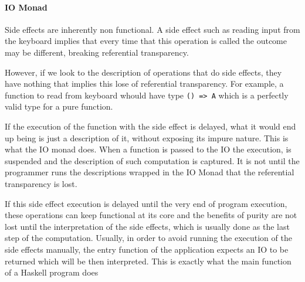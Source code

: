 \documentclass[../main.tex]{subfiles}
\begin{document}



\paragraph{IO Monad}
Side effects are inherently non functional. A side effect such as reading input
from the keyboard implies that every time that this operation is called the
outcome may be different, breaking referential transparency.

However, if we look to the description of operations that do side effects, they
have nothing that implies this lose of referential transparency. For example,
a function to read from keyboard whould have type \texttt{() => A} which is a
perfectly valid type for a pure function.

If the execution of the function with the side effect is delayed, what it
would end up being is just a description of it, without exposing its impure
nature. This is what the IO monad does. When a function is passed to the IO
the execution, is suspended and the description of such computation is captured. It is not
until the programmer runs the descriptions wrapped in the IO Monad that the
referential transparency is lost.

If this side effect execution is delayed until the very end of program execution, these operations
can keep functional at its core and the benefits of purity are not lost until
the interpretation of the side effects, which is usually done as the last step of
the computation. Usually, in order to avoid running the execution of the side
effects manually, the entry function of the application expects an IO to be
returned which will be then interpreted. This is exactly what the main function of a Haskell program does \autocite{AIO}

 
\end{document}
